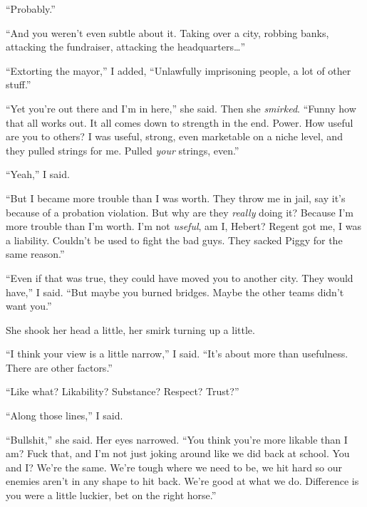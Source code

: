 ``Probably.''



``And you weren't even subtle about it.  Taking over a city, robbing banks, attacking the fundraiser, attacking the headquarters\ldots''



``Extorting the mayor,'' I added, ``Unlawfully imprisoning people, a lot of other stuff.''



``Yet you're out there and I'm in here,'' she said.  Then she \emph{smirked}.  ``Funny how that all works out.  It all comes down to strength in the end.  Power.  How useful are you to others?  I was useful, strong, even marketable on a niche level, and they pulled strings for me.  Pulled \emph{your }strings, even.''



``Yeah,'' I said.



``But I became more trouble than I was worth.  They throw me in jail, say it's because of a probation violation.  But why are they \emph{really} doing it?  Because I'm more trouble than I'm worth.  I'm not \emph{useful}, am I, Hebert?  Regent got me, I was a liability.  Couldn't be used to fight the bad guys.  They sacked Piggy for the same reason.''



``Even if that was true, they could have moved you to another city.  They would have,'' I said.  ``But maybe you burned bridges.  Maybe the other teams didn't want you.''



She shook her head a little, her smirk turning up a little.



``I think your view is a little narrow,'' I said.  ``It's about more than usefulness.  There are other factors.''



``Like what?  Likability?  Substance?  Respect?  Trust?''



``Along those lines,'' I said.



``Bullshit,'' she said.  Her eyes narrowed.  ``You think you're more likable than I am?  Fuck that, and I'm not just joking around like we did back at school.  You and I?  We're the same.  We're tough where we need to be, we hit hard so our enemies aren't in any shape to hit back.  We're good at what we do.  Difference is you were a little luckier, bet on the right horse.''



